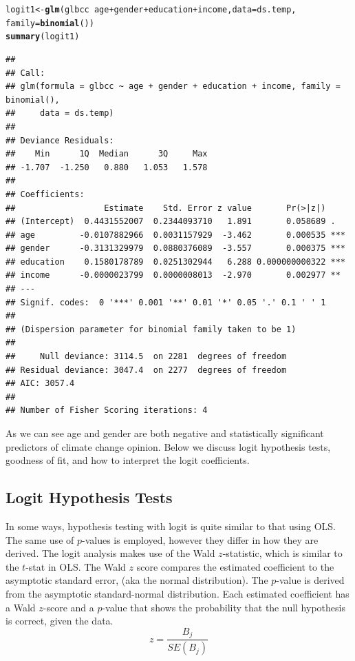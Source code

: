 \documentclass[11pt,openany]{book}\usepackage[]{graphicx}\usepackage[]{color}
\makeatletter
\newcommand{\hlopt}[1]{\textcolor[rgb]{0,0,0}{#1}}%
\newcommand{\hlstd}[1]{\textcolor[rgb]{0.345,0.345,0.345}{#1}}%
\newcommand{\hlkwb}[1]{\textcolor[rgb]{0.69,0.353,0.396}{#1}}%
\newcommand{\hlkwc}[1]{\textcolor[rgb]{0.333,0.667,0.333}{#1}}%
\newcommand{\hlkwd}[1]{\textcolor[rgb]{0.737,0.353,0.396}{\textbf{#1}}}%
\newenvironment{kframe}{%
 \def\at@end@of@kframe{}%
 \ifinner\ifhmode%
  \def\at@end@of@kframe{\end{minipage}}%
  \begin{minipage}{\columnwidth}%
 \fi\fi%
 \def\FrameCommand##1{\hskip\@totalleftmargin \hskip-\fboxsep
 \colorbox{shadecolor}{##1}\hskip-\fboxsep
     \hskip-\linewidth \hskip-\@totalleftmargin \hskip\columnwidth}%
 \MakeFramed {\advance\hsize-\width
   \@totalleftmargin\z@ \linewidth\hsize
   \@setminipage}}%
 {\par\unskip\endMakeFramed%
 \at@end@of@kframe}
\newenvironment{knitrout}{}{} %
\renewenvironment{knitrout}{\begin{singlespace}}{\end{singlespace}} %
\makeatother
\begin{document}
\begin{knitrout}
\color{fgcolor}\begin{kframe}
\begin{alltt}
\hlstd{logit1} \hlkwb{<-} \hlkwd{glm}\hlstd{(glbcc} \hlopt{~} \hlstd{age} \hlopt{+} \hlstd{gender} \hlopt{+} \hlstd{education} \hlopt{+} \hlstd{income,} \hlkwc{data} \hlstd{= ds.temp,}
    \hlkwc{family} \hlstd{=} \hlkwd{binomial}\hlstd{())}
\hlkwd{summary}\hlstd{(logit1)}
\end{alltt}
\begin{verbatim}
## 
## Call:
## glm(formula = glbcc ~ age + gender + education + income, family = binomial(), 
##     data = ds.temp)
## 
## Deviance Residuals: 
##    Min      1Q  Median      3Q     Max  
## -1.707  -1.250   0.880   1.053   1.578  
## 
## Coefficients:
##                  Estimate    Std. Error z value       Pr(>|z|)    
## (Intercept)  0.4431552007  0.2344093710   1.891       0.058689 .  
## age         -0.0107882966  0.0031157929  -3.462       0.000535 ***
## gender      -0.3131329979  0.0880376089  -3.557       0.000375 ***
## education    0.1580178789  0.0251302944   6.288 0.000000000322 ***
## income      -0.0000023799  0.0000008013  -2.970       0.002977 ** 
## ---
## Signif. codes:  0 '***' 0.001 '**' 0.01 '*' 0.05 '.' 0.1 ' ' 1
## 
## (Dispersion parameter for binomial family taken to be 1)
## 
##     Null deviance: 3114.5  on 2281  degrees of freedom
## Residual deviance: 3047.4  on 2277  degrees of freedom
## AIC: 3057.4
## 
## Number of Fisher Scoring iterations: 4
\end{verbatim}
\end{kframe}
\end{knitrout}
\noindent As we can see age and gender are both negative and statistically significant predictors of climate change opinion. Below we discuss logit hypothesis tests, goodness of fit, and how to interpret the logit coefficients.  

\subsection{Logit Hypothesis Tests} 

In some ways, hypothesis testing with logit is quite similar to that using OLS. The same use of  $p$-values is employed, however they differ in
how they are derived. The logit analysis makes use of the Wald $z$-statistic, which is similar to the $t$-stat in OLS. The Wald $z$ score compares the estimated coefficient to the asymptotic standard error, (aka the normal distribution). The $p$-value is derived from the asymptotic standard-normal distribution. Each estimated coefficient has a Wald $z$-score and a $p$-value that shows the probability that the null hypothesis is correct, given the data. 
\begin{equation}
  \label{eq:wald}
  z = \frac{B_j}{SE(B_j)} 
\end{equation}
 
\end{document}
